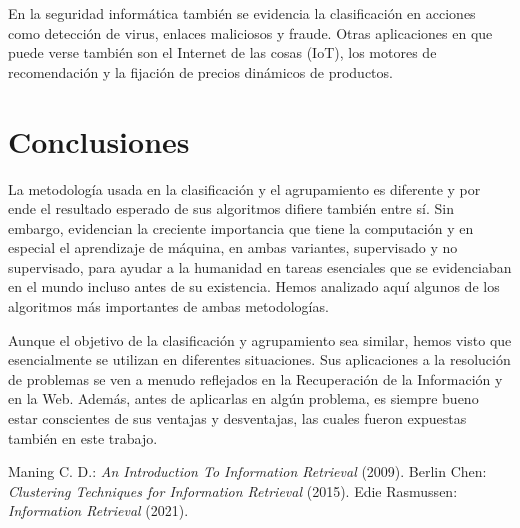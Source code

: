 \documentclass{llncs}
\begin{document}
En la seguridad inform\'atica tambi\'en se evidencia la clasificaci\'on en acciones como detecci\'on de virus, enlaces maliciosos y fraude. Otras aplicaciones en que puede verse tambi\'en son el Internet de las cosas (IoT), los motores de recomendaci\'on y la fijaci\'on de precios din\'amicos de productos.

\section{Conclusiones}

	La metodolog\'ia usada en la clasificaci\'on y el agrupamiento es diferente y por ende el resultado esperado de sus algoritmos difiere tambi\'en entre s\'i. Sin embargo, evidencian la creciente importancia que tiene la computaci\'on y en especial el aprendizaje de m\'aquina, en ambas variantes, supervisado y no supervisado, para ayudar a la humanidad en tareas esenciales que se evidenciaban en el mundo incluso antes de su existencia. Hemos analizado aqu\'i algunos de los algoritmos m\'as importantes de ambas metodolog\'ias. 
	
	Aunque el objetivo de la clasificaci\'on y agrupamiento sea similar, hemos visto que esencialmente se utilizan en diferentes situaciones.  Sus aplicaciones a la resoluci\'on de problemas se ven a menudo reflejados en la Recuperaci\'on de la Informaci\'on y en la Web. Adem\'as, antes de aplicarlas en alg\'un problema, es siempre bueno estar conscientes de sus ventajas y desventajas, las cuales fueron expuestas tambi\'en en este trabajo.

\begin{thebibliography}{20}
	 Maning C. D.: \emph{An Introduction To Information Retrieval} (2009).
	 Berlin Chen: \emph{Clustering Techniques for
		Information Retrieval} (2015).
	 Edie Rasmussen: \emph{Information Retrieval} (2021).
\end{thebibliography}
\end{document}
